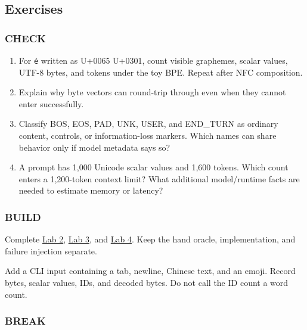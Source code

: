 \documentclass[
  10pt,
]{article}
\providecommand{\tightlist}{%
  \setlength{\itemsep}{0pt}\setlength{\parskip}{0pt}}
\begin{document}
\subsection{Exercises}\label{exercises-1}

\subsubsection{CHECK}\label{check-1}

\begin{enumerate}
\def\labelenumi{\arabic{enumi}.}
\tightlist
\item
  For \texttt{é} written as U+0065 U+0301, count visible graphemes,
  scalar values, UTF-8 bytes, and tokens under the toy BPE. Repeat after
  NFC composition.
\item
  Explain why byte vectors can round-trip through
  \texttt{} even when they cannot enter
  \texttt{} successfully.
\item
  Classify BOS, EOS, PAD, UNK, USER, and END\_TURN as ordinary content,
  controls, or information-loss markers. Which names can share behavior
  only if model metadata says so?
\item
  A prompt has 1,000 Unicode scalar values and 1,600 tokens. Which count
  enters a 1,200-token context limit? What additional model/runtime
  facts are needed to estimate memory or latency?
\end{enumerate}

\subsubsection{BUILD}\label{build-1}

Complete
\href{https://github.com/hermonai/inside-the-llm-engine/blob/astra-visual-rewrite/labs/lab-02-tokenize-by-hand.md}{Lab
2},
\href{https://github.com/hermonai/inside-the-llm-engine/blob/astra-visual-rewrite/labs/lab-03-stream-utf8-across-tokens.md}{Lab
3}, and
\href{https://github.com/hermonai/inside-the-llm-engine/blob/astra-visual-rewrite/labs/lab-04-use-the-wrong-chat-template.md}{Lab
4}. Keep the hand oracle, implementation, and failure injection
separate.

Add a CLI input containing a tab, newline, Chinese text, and an emoji.
Record bytes, scalar values, IDs, and decoded bytes. Do not call the ID
count a word count.

\subsubsection{BREAK}\label{break-1}
\end{document}
